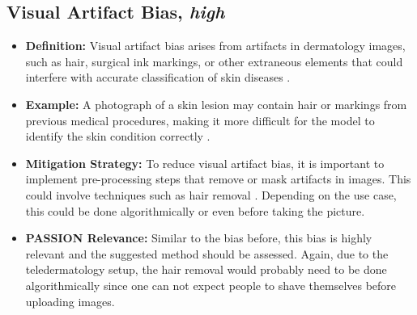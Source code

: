 \documentclass[12pt, a4paper, oneside]{book}   	%
\begin{document}
\begin{appendices}
		\subsection{Visual Artifact Bias, \textit{high}}
		\begin{itemize}
			\item \textbf{Definition:} Visual artifact bias arises from artifacts in dermatology images, such as hair, surgical ink markings, or other extraneous elements that could interfere with accurate classification of skin diseases \autocite{Winkler_2019, Bisla_2019, Young_2020}.
			\item \textbf{Example:} A photograph of a skin lesion may contain hair or markings from previous medical procedures, making it more difficult for the model to identify the skin condition correctly \autocite{Young_2020}.
			\item \textbf{Mitigation Strategy:} To reduce visual artifact bias, it is important to implement pre-processing steps that remove or mask artifacts in images. This could involve techniques such as hair removal \autocite{Bisla_2019}. Depending on the use case, this could be done algorithmically or even before taking the picture.
			\item \textbf{PASSION Relevance:} Similar to the bias before, this bias is highly relevant and the suggested method should be assessed. Again, due to the \gls{teledermatology} setup, the hair removal would probably need to be done algorithmically since one can not expect people to shave themselves before uploading images.
		\end{itemize}
		

\end{appendices}
\end{document}

